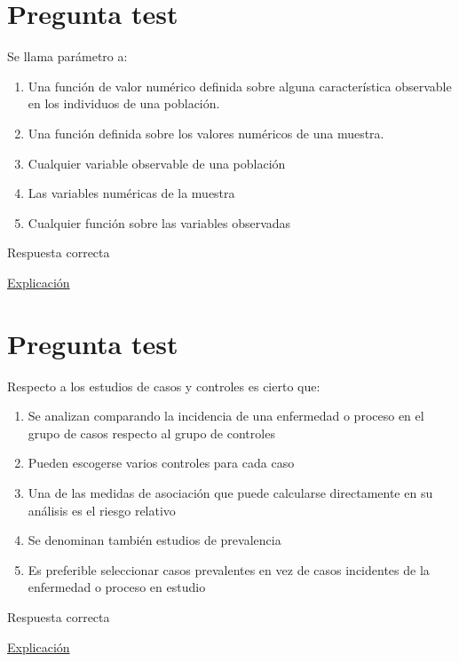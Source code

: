 \documentclass[
]{book}
\providecommand{\tightlist}{%
  \setlength{\itemsep}{0pt}\setlength{\parskip}{0pt}}
\begin{document}
\hypertarget{pregunta-test-21}{%
\section{Pregunta test}\label{pregunta-test-21}}

Se llama parámetro a:

\begin{enumerate}
\def\labelenumi{\alph{enumi})}
\tightlist
\item
  Una función de valor numérico definida sobre alguna característica observable en los individuos de una población.
\item
  Una función definida sobre los valores numéricos de una muestra.
\item
  Cualquier variable observable de una población
\item
  Las variables numéricas de la muestra
\item
  Cualquier función sobre las variables observadas
\end{enumerate}

Respuesta correcta

\href{https://1fjmanzano.github.io/bioestadistica/conceptos-previos.html}{Explicación}

\hypertarget{pregunta-test-22}{%
\section{Pregunta test}\label{pregunta-test-22}}

Respecto a los estudios de casos y controles es cierto que:

\begin{enumerate}
\def\labelenumi{\alph{enumi})}
\tightlist
\item
  Se analizan comparando la incidencia de una enfermedad o proceso en el grupo de casos respecto al grupo de controles
\item
  Pueden escogerse varios controles para cada caso
\item
  Una de las medidas de asociación que puede calcularse directamente en su análisis es el riesgo relativo
\item
  Se denominan también estudios de prevalencia
\item
  Es preferible seleccionar casos prevalentes en vez de casos incidentes de la enfermedad o proceso en estudio
\end{enumerate}

Respuesta correcta

\href{https://dsp.facmed.unam.mx/wp-content/uploads/2022/02/Anexo-1C-U-9-Estudios-de-casos-y-controles.-Argimon-J.pdf}{Explicación}
\end{document}
